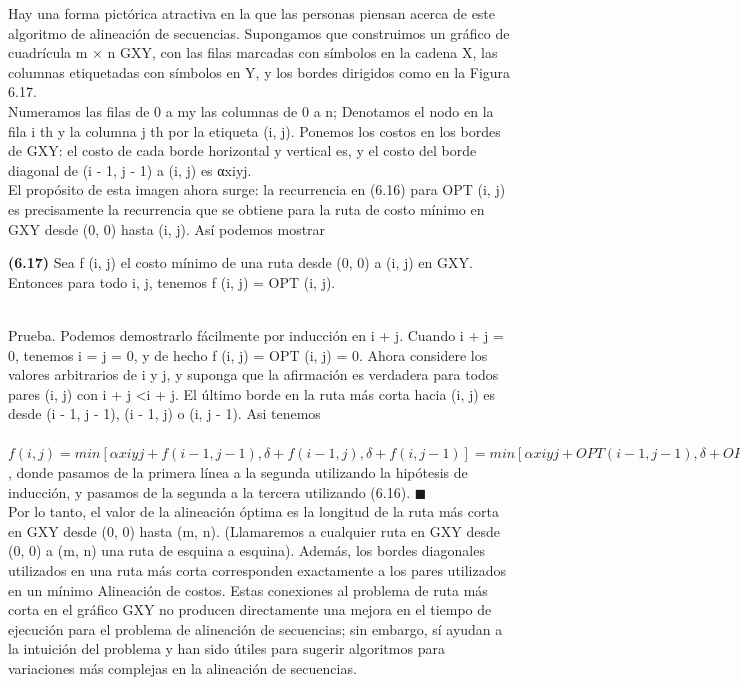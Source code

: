 \documentclass[a4paper]{article}
\begin{document}
Hay una forma pictórica atractiva en la que las personas piensan acerca de este algoritmo de alineación de secuencias. Supongamos que construimos un gráfico de cuadrícula m × n GXY, con las filas marcadas con símbolos en la cadena X, las columnas etiquetadas con símbolos en Y, y los bordes dirigidos como en la Figura 6.17.\\

Numeramos las filas de 0 a my las columnas de 0 a n; Denotamos el nodo en la fila i th y la columna j th por la etiqueta (i, j). Ponemos los costos en los bordes de GXY: el costo de cada borde horizontal y vertical es, y el costo del borde diagonal de (i - 1, j - 1) a (i, j) es αxiyj.\\

El propósito de esta imagen ahora surge: la recurrencia en (6.16) para OPT (i, j) es precisamente la recurrencia que se obtiene para la ruta de costo mínimo en GXY desde (0, 0) hasta (i, j). Así podemos mostrar\\


\colorbox{mygray}{\parbox{15cm}{
\textbf{(6.17)} Sea f (i, j) el costo mínimo de una ruta desde (0, 0) a (i, j) en GXY. Entonces para todo i, j, tenemos f (i, j) = OPT (i, j).}}\\

Prueba. Podemos demostrarlo fácilmente por inducción en i + j. Cuando i + j = 0, tenemos i = j = 0, y de hecho f (i, j) = OPT (i, j) = 0. Ahora considere los valores arbitrarios de i y j, y suponga que la afirmación es verdadera para todos pares (i, j) con i + j <i + j. El último borde en la ruta más corta hacia (i, j) es desde (i - 1, j - 1), (i - 1, j) o (i, j - 1). Asi tenemos\\

  $f (i, j) = min [αxiyj + f (i - 1, j - 1), δ + f (i - 1, j), δ + f (i, j - 1)] = min [αxiyj + OPT (i - 1, j - 1), δ + OPT (i - 1, j), δ + OPT (i, j - 1)] = OPT (i, j)$, donde pasamos de la primera línea a la segunda utilizando la hipótesis de inducción, y pasamos de la segunda a la tercera utilizando (6.16). $\blacksquare$\\

Por lo tanto, el valor de la alineación óptima es la longitud de la ruta más corta en GXY desde (0, 0) hasta (m, n). (Llamaremos a cualquier ruta en GXY desde (0, 0) a (m, n) una ruta de esquina a esquina). Además, los bordes diagonales utilizados en una ruta más corta corresponden exactamente a los pares utilizados en un mínimo Alineación de costos. Estas conexiones al problema de ruta más corta en el gráfico GXY no producen directamente una mejora en el tiempo de ejecución para el problema de alineación de secuencias; sin embargo, sí ayudan a la intuición del problema y han sido útiles para sugerir algoritmos para variaciones más complejas en la alineación de secuencias.\\
\end{document}
